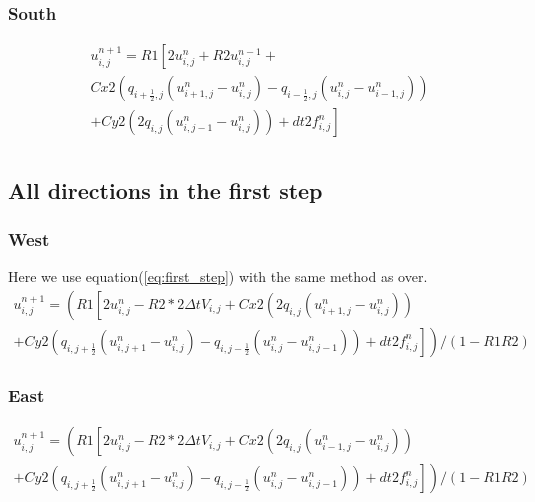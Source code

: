 \documentclass[norsk,11pt,a4paper]{article}
\begin{document}
\subsubsection*{South}

\begin{equation}\label{eq:south_general}
\begin{aligned}
u^{n+1}_{i,j} = R1\left[ 2u^n_{i,j}+R2u^{n-1}_{i,j} + \right.\\
\left.Cx2\left(q_{i+\frac{1}{2},j}(u^n_{i+1,j}-u^n_{i,j})-q_{i-\frac{1}{2},j}(u^n_{i,j}-u^n_{i-1,j})\right)\right. \\
+ \left.Cy2\left(2q_{i,j}(u^n_{i,j-1}-u^n_{i,j})\right) + dt2 f^n_{i,j}\right]\\
\end{aligned}
\end{equation}

\subsection*{All directions in the first step}
\subsubsection*{West}
Here we use equation(\ref{eq:first_step}) with the same method as over.
\begin{equation}
\begin{aligned}
u^{n+1}_{i,j}= \left(R1\left[ 2u^n_{i,j}-R2*2\Delta t V_{i,j}+Cx2\left(2q_{i,j}(u^n_{i+1,j}-u^n_{i,j})\right)\right.\right. \\
+ \left.\left.Cy2\left(q_{i,j+\frac{1}{2}}(u^n_{i,j+1}-u^n_{i,j})-q_{i,j-\frac{1}{2}}(u^n_{i,j}-u^n_{i,j-1})\right) + dt2 f^n_{i,j}\right]\right)/(1-R1R2)
\end{aligned}
\end{equation}

\subsubsection*{East}
\begin{equation}
\begin{aligned}
u^{n+1}_{i,j}= \left(R1\left[ 2u^n_{i,j}-R2*2\Delta t V_{i,j}+Cx2\left(2q_{i,j}(u^n_{i-1,j}-u^n_{i,j})\right)\right.\right. \\
+ \left.\left.Cy2\left(q_{i,j+\frac{1}{2}}(u^n_{i,j+1}-u^n_{i,j})-q_{i,j-\frac{1}{2}}(u^n_{i,j}-u^n_{i,j-1})\right) + dt2 f^n_{i,j}\right]\right)/(1-R1R2)
\end{aligned}
\end{equation}
\end{document}

